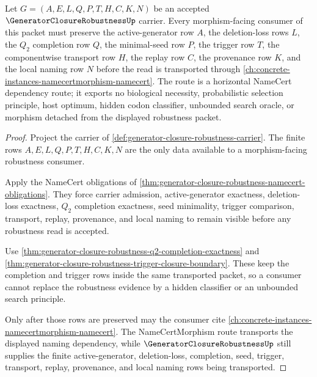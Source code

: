 \begin{theorem}
\label{thm:generator-closure-robustness-namecert-morphism-dependency-route}
Let $G=(A,E,L,Q,P,T,H,C,K,N)$ be an accepted $\GeneratorClosureRobustnessUp$ carrier. Every morphism-facing consumer of this packet must preserve the active-generator row $A$, the deletion-loss rows $L$, the $Q_{2}$ completion row $Q$, the minimal-seed row $P$, the trigger row $T$, the componentwise transport row $H$, the replay row $C$, the provenance row $K$, and the local naming row $N$ before the read is transported through \autoref{ch:concrete-instances-namecertmorphism-namecert}. The route is a horizontal NameCert dependency route; it exports no biological necessity, probabilistic selection principle, host optimum, hidden codon classifier, unbounded search oracle, or morphism detached from the displayed robustness packet.
\end{theorem}
\begin{proof}
Project the carrier of \autoref{def:generator-closure-robustness-carrier}. The finite rows $A,E,L,Q,P,T,H,C,K,N$ are the only data available to a morphism-facing robustness consumer.

Apply the NameCert obligations of \autoref{thm:generator-closure-robustness-namecert-obligations}. They force carrier admission, active-generator exactness, deletion-loss exactness, $Q_{2}$ completion exactness, seed minimality, trigger comparison, transport, replay, provenance, and local naming to remain visible before any robustness read is accepted.

Use \autoref{thm:generator-closure-robustness-q2-completion-exactness} and \autoref{thm:generator-closure-robustness-trigger-closure-boundary}. These keep the completion and trigger rows inside the same transported packet, so a consumer cannot replace the robustness evidence by a hidden classifier or an unbounded search principle.

Only after those rows are preserved may the consumer cite \autoref{ch:concrete-instances-namecertmorphism-namecert}. The NameCertMorphism route transports the displayed naming dependency, while $\GeneratorClosureRobustnessUp$ still supplies the finite active-generator, deletion-loss, completion, seed, trigger, transport, replay, provenance, and local naming rows being transported.
\end{proof}
